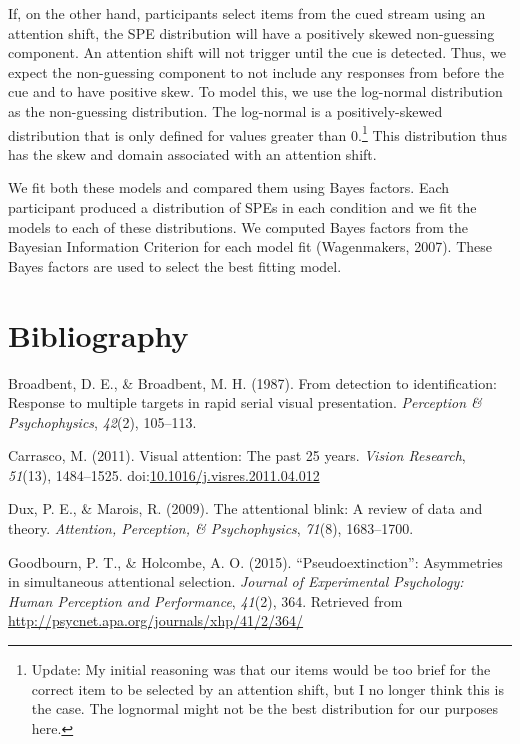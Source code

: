 \documentclass[,man,floatsintext]{apa6}
\let\rmarkdownfootnote\footnote%
\def\footnote{\protect\rmarkdownfootnote}
\theoremstyle{definition}
\theoremstyle{definition}
\theoremstyle{definition}
\theoremstyle{remark}
\begin{document}
If, on the other hand, participants select items from the cued stream
using an attention shift, the SPE distribution will have a positively
skewed non-guessing component. An attention shift will not trigger until
the cue is detected. Thus, we expect the non-guessing component to not
include any responses from before the cue and to have positive skew. To
model this, we use the log-normal distribution as the non-guessing
distribution. The log-normal is a positively-skewed distribution that is
only defined for values greater than 0.\footnote{Update: My initial
  reasoning was that our items would be too brief for the correct item
  to be selected by an attention shift, but I no longer think this is
  the case. The lognormal might not be the best distribution for our
  purposes here.} This distribution thus has the skew and domain
associated with an attention shift.

We fit both these models and compared them using Bayes factors. Each
participant produced a distribution of SPEs in each condition and we fit
the models to each of these distributions. We computed Bayes factors
from the Bayesian Information Criterion for each model fit (Wagenmakers,
2007). These Bayes factors are used to select the best fitting model.

\pagebreak

\section*{Bibliography}\label{bibliography}

\hypertarget{refs}{}
\hypertarget{ref-broadbent_detection_1987}{}
Broadbent, D. E., \& Broadbent, M. H. (1987). From detection to
identification: Response to multiple targets in rapid serial visual
presentation. \emph{Perception \& Psychophysics}, \emph{42}(2),
105--113.

\hypertarget{ref-carrasco_visual_2011}{}
Carrasco, M. (2011). Visual attention: The past 25 years. \emph{Vision
Research}, \emph{51}(13), 1484--1525.
doi:\href{https://doi.org/10.1016/j.visres.2011.04.012}{10.1016/j.visres.2011.04.012}

\hypertarget{ref-dux_attentional_2009}{}
Dux, P. E., \& Marois, R. (2009). The attentional blink: A review of
data and theory. \emph{Attention, Perception, \& Psychophysics},
\emph{71}(8), 1683--1700.

\hypertarget{ref-goodbourn_pseudoextinction}{}
Goodbourn, P. T., \& Holcombe, A. O. (2015). ``Pseudoextinction'':
Asymmetries in simultaneous attentional selection. \emph{Journal of
Experimental Psychology: Human Perception and Performance},
\emph{41}(2), 364. Retrieved from
\url{http://psycnet.apa.org/journals/xhp/41/2/364/}
\end{document}
